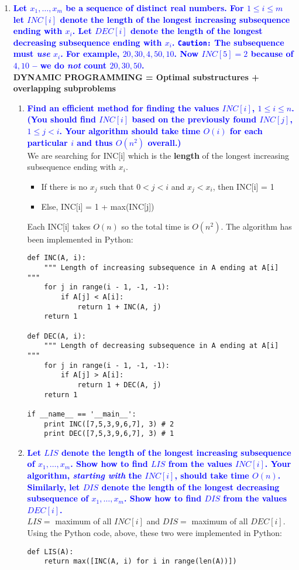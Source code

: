 \documentclass[11pt]{article}
\begin{document}
\begin{enumerate}
    
\item \textbf{\textcolor{blue}{Let $x_1,\ldots,x_m$ be a sequence of distinct real numbers. For $1\leq i\leq m$ let $INC[i]$ denote the length of the longest
increasing subsequence ending with $x_i$.  Let $DEC[i]$ denote the 
length of the longest decreasing subsequence ending with $x_i$.  
{\tt Caution:} The subsequence must {\em use} $x_i$.  For example,
$20,30,4,50, 10$.  Now $INC[5]=2$ because of $4,10$ -- we do
{\em not} count $20,30,50$.}}
    \\ \textbf{DYNAMIC PROGRAMMING = Optimal substructures + overlapping subproblems}
    \begin{enumerate}
    \item \textbf{\textcolor{blue}{Find an efficient method for finding the values $INC[i]$, $1\leq i\leq n$. (You should find $INC[i]$ based on the previously found $INC[j]$, $1\leq j< i$.  Your algorithm should take time $O(i)$ for each
    particular $i$ and thus $O(n^2)$ overall.)}}
        \\ We are searching for INC[i] which is the \textbf{length} of the longest increasing subsequence ending with $x_i$.
        \begin{itemize}
            \item If there is no $x_j$ such that $0 < j < i$ and $x_j < x_i$, then INC[i] = 1
            \item Else, INC[i] = 1 + max(INC[j])
        \end{itemize}
        Each INC[i] takes $O(n)$ so the total time is $O(n^2)$. The algorithm has been implemented in Python:
        \begin{verbatim}
def INC(A, i):
    """ Length of increasing subsequence in A ending at A[i] """
    for j in range(i - 1, -1, -1):
        if A[j] < A[i]:
            return 1 + INC(A, j)
    return 1

def DEC(A, i):
    """ Length of decreasing subsequence in A ending at A[i] """
    for j in range(i - 1, -1, -1):
        if A[j] > A[i]:
            return 1 + DEC(A, j)
    return 1

if __name__ == '__main__':
    print INC([7,5,3,9,6,7], 3) # 2
    print DEC([7,5,3,9,6,7], 3) # 1
        \end{verbatim}

    \item \textbf{\textcolor{blue}{Let $LIS$ denote the length of the longest increasing subsequence of $x_1,\ldots,x_m$.  Show how to find $LIS$ from
    the values $INC[i]$. Your algorithm, {\em starting with} the $INC[i]$,
    should take time $O(n)$. Similarly, let $DIS$ denote the length of the longest
    decreasing subsequence of $x_1,\ldots,x_m$.  Show how to find $DIS$ from
    the values $DEC[i]$. }}
        \\ $LIS =$ maximum of all $INC[i]$ and $DIS =$ maximum of all $DEC[i]$.
        \\ Using the Python code, above, these two were implemented in Python:
        \begin{verbatim}
def LIS(A):
    return max([INC(A, i) for i in range(len(A))])


\end{verbatim}
\end{enumerate}
\end{enumerate}
\end{document}
